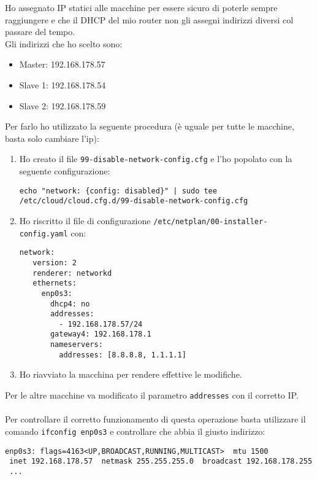 Ho assegnato IP statici alle macchine per essere sicuro di poterle sempre raggiungere e che
il DHCP del mio router non gli assegni indirizzi diversi col passare del tempo.\\
Gli indirizzi che ho scelto sono:
\begin{itemize}
	\item Master: 192.168.178.57
	\item Slave 1: 192.168.178.54
	\item Slave 2: 192.168.178.59
\end{itemize}
Per farlo ho utilizzato la seguente procedura (\`{e} uguale per tutte le macchine, basta solo cambiare l'ip):

\begin{enumerate}
	\item Ho creato il file \lstinline[style=cmd]|99-disable-network-config.cfg| e l'ho popolato con la seguente configurazione:
	
	\begin{lstlisting}[style=cmd]
 echo "network: {config: disabled}" | sudo tee /etc/cloud/cloud.cfg.d/99-disable-network-config.cfg
	\end{lstlisting}
	\item Ho riscritto il file di configurazione \lstinline[style=cmd]|/etc/netplan/00-installer-config.yaml| con:
	
	\begin{lstlisting}[style=cmd]
 network:
   version: 2
   renderer: networkd
   ethernets:
     enp0s3:
       dhcp4: no
       addresses:
         - 192.168.178.57/24
       gateway4: 192.168.178.1
       nameservers:
         addresses: [8.8.8.8, 1.1.1.1]
	\end{lstlisting}
	\item Ho riavviato la macchina per rendere effettive le modifiche.
\end{enumerate}

Per le altre macchine va modificato il parametro \lstinline[style=cmd]|addresses| con il corretto IP.\\
\ \\
Per controllare il corretto funzionamento di questa operazione basta utilizzare il comando \lstinline[style=cmd]|ifconfig enp0s3| e controllare che abbia il giusto indirizzo:

\begin{lstlisting}[style=output]
 enp0s3: flags=4163<UP,BROADCAST,RUNNING,MULTICAST>  mtu 1500
 inet 192.168.178.57  netmask 255.255.255.0  broadcast 192.168.178.255
 ...
\end{lstlisting}
 
